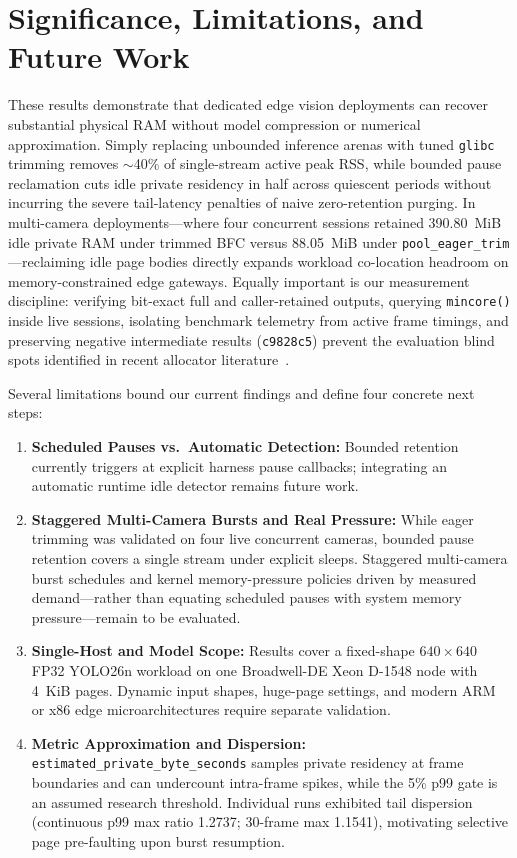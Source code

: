 \documentclass[sigconf,screen,nonacm]{acmart}
\begin{document}
\section{Significance, Limitations, and Future Work}
These results demonstrate that dedicated edge vision deployments can recover substantial physical RAM without model compression or numerical approximation. Simply replacing unbounded inference arenas with tuned \texttt{glibc} trimming removes $\sim$40\% of single-stream active peak RSS, while bounded pause reclamation cuts idle private residency in half across quiescent periods without incurring the severe tail-latency penalties of naive zero-retention purging. In multi-camera deployments---where four concurrent sessions retained 390.80~MiB idle private RAM under trimmed BFC versus 88.05~MiB under \texttt{pool\_eager\_trim}---reclaiming idle page bodies directly expands workload co-location headroom on memory-constrained edge gateways. Equally important is our measurement discipline: verifying bit-exact full and caller-retained outputs, querying \texttt{mincore()} inside live sessions, isolating benchmark telemetry from active frame timings, and preserving negative intermediate results (\texttt{c9828c5}) prevent the evaluation blind spots identified in recent allocator literature~\cite{fistanto2026lostbytes,vankempen2026reconsidering}.

Several limitations bound our current findings and define four concrete next steps:
\begin{enumerate}
  \item \textbf{Scheduled Pauses vs.\ Automatic Detection:} Bounded retention currently triggers at explicit harness pause callbacks; integrating an automatic runtime idle detector remains future work.
  \item \textbf{Staggered Multi-Camera Bursts and Real Pressure:} While eager trimming was validated on four live concurrent cameras, bounded pause retention covers a single stream under explicit sleeps. Staggered multi-camera burst schedules and kernel memory-pressure policies driven by measured demand---rather than equating scheduled pauses with system memory pressure---remain to be evaluated.
  \item \textbf{Single-Host and Model Scope:} Results cover a fixed-shape $640 \times 640$ FP32 YOLO26n workload on one Broadwell-DE Xeon D-1548 node with 4~KiB pages. Dynamic input shapes, huge-page settings, and modern ARM or x86 edge microarchitectures require separate validation.
  \item \textbf{Metric Approximation and Dispersion:} \texttt{estimated\_\allowbreak private\_\allowbreak byte\_\allowbreak seconds} samples private residency at frame boundaries and can undercount intra-frame spikes, while the 5\% p99 gate is an assumed research threshold. Individual runs exhibited tail dispersion (continuous p99 max ratio 1.2737; 30-frame max 1.1541), motivating selective page pre-faulting upon burst resumption.
\end{enumerate}
\end{document}
